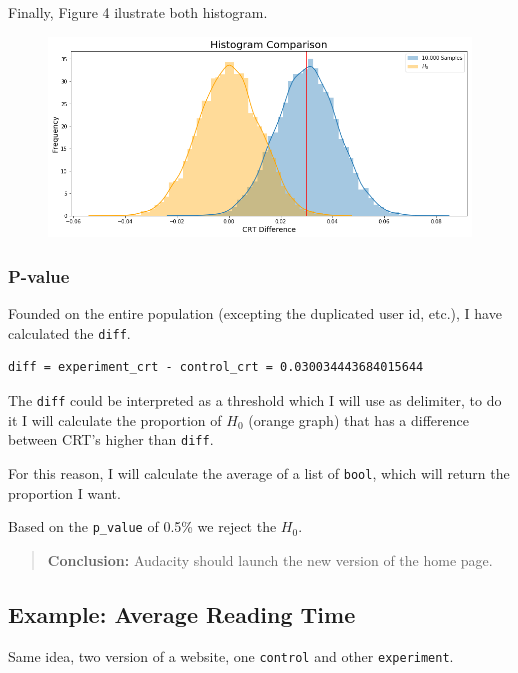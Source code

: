 \documentclass[]{book}
\begin{document}
Finally, Figure 4 ilustrate both histogram.

\begin{figure}
\centering
\includegraphics{01-img/c4_l13_04.png}
\caption{}
\end{figure}

\subsubsection*{P-value}\label{p-value-1}

Founded on the entire population (excepting the duplicated user id,
etc.), I have calculated the \texttt{diff}.

\begin{verbatim}
diff = experiment_crt - control_crt = 0.030034443684015644
\end{verbatim}

The \texttt{diff} could be interpreted as a threshold which I will use
as delimiter, to do it I will calculate the proportion of \(H_0\)
(orange graph) that has a difference between CRT's higher than
\texttt{diff}.

For this reason, I will calculate the average of a list of
\texttt{bool}, which will return the proportion I want.

Based on the \texttt{p\_value} of 0.5\% we reject the \(H_0\).

\begin{quote}
\textbf{Conclusion:} Audacity should launch the new version of the home
page.
\end{quote}

\subsection{Example: Average Reading
Time}\label{example-average-reading-time}

Same idea, two version of a website, one \texttt{control} and other
\texttt{experiment}.
\end{document}
